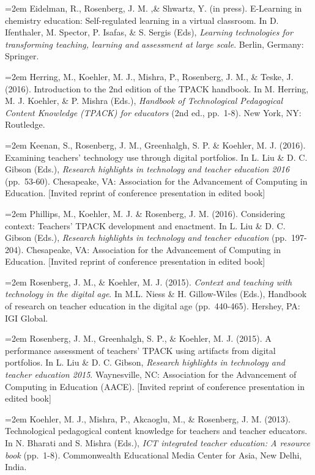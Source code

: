 \documentclass[14,]{article}
\begin{document}
\hangindent=2em Eidelman, R., Rosenberg, J. M. ,\& Shwartz, Y. (in
press). E-Learning in chemistry education: Self-regulated learning in a
virtual classroom. In D. Ifenthaler, M. Spector, P. Isafas, \& S. Sergis
(Eds), \emph{Learning technologies for transforming teaching, learning
and assessment at large scale}. Berlin, Germany: Springer.

\hangindent=2em Herring, M., Koehler, M. J., Mishra, P., Rosenberg, J.
M., \& Teske, J. (2016). Introduction to the 2nd edition of the TPACK
handbook. In M. Herring, M. J. Koehler, \& P. Mishra (Eds.),
\emph{Handbook of Technological Pedagogical Content Knowledge (TPACK)
for educators} (2nd ed., pp.~1-8). New York, NY: Routledge.

\hangindent=2em Keenan, S., Rosenberg, J. M., Greenhalgh, S. P. \&
Koehler, M. J. (2016). Examining teachers' technology use through
digital portfolios. In L. Liu \& D. C. Gibson (Eds.), \emph{Research
highlights in technology and teacher education 2016} (pp.~53-60).
Chesapeake, VA: Association for the Advancement of Computing in
Education. {[}Invited reprint of conference presentation in edited
book{]}

\hangindent=2em Phillips, M., Koehler, M. J. \& Rosenberg, J. M. (2016).
Considering context: Teachers' TPACK development and enactment. In L.
Liu \& D. C. Gibson (Eds.), \emph{Research highlights in technology and
teacher education} (pp.~197-204). Chesapeake, VA: Association for the
Advancement of Computing in Education. {[}Invited reprint of conference
presentation in edited book{]}

\hangindent=2em Rosenberg, J. M., \& Koehler, M. J. (2015).
\emph{Context and teaching with technology in the digital age}. In M.L.
Niess \& H. Gillow-Wiles (Eds.), Handbook of research on teacher
education in the digital age (pp.~440-465). Hershey, PA: IGI Global.

\hangindent=2em Rosenberg, J. M., Greenhalgh, S. P., \& Koehler, M. J.
(2015). A performance assessment of teachers' TPACK using artifacts from
digital portfolios. In L. Liu \& D. C. Gibson, \emph{Research highlights
in technology and teacher education 2015}. Waynesville, NC: Association
for the Advancement of Computing in Education (AACE). {[}Invited reprint
of conference presentation in edited book{]}

\hangindent=2em Koehler, M. J., Mishra, P., Akcaoglu, M., \& Rosenberg,
J. M. (2013). Technological pedagogical content knowledge for teachers
and teacher educators. In N. Bharati and S. Mishra (Eds.), \emph{ICT
integrated teacher education: A resource book} (pp.~1-8). Commonwealth
Educational Media Center for Asia, New Delhi, India.
\end{document}
